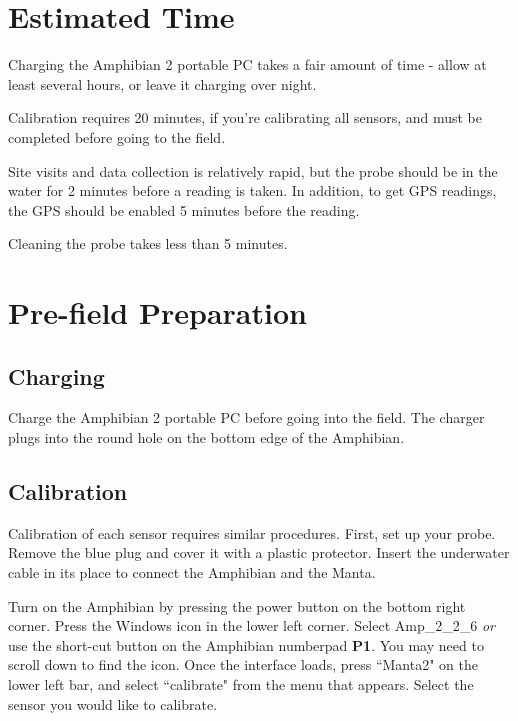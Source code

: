 \documentclass[12pt]{../SOP3}\usepackage[]{graphicx}\usepackage[]{color}
\begin{document}

\section{Estimated Time}

\NP Charging the Amphibian 2 portable PC takes a fair amount of time - allow at least several hours, or leave it charging over night. 

\NP Calibration requires 20 minutes, if you're calibrating all sensors, and must be completed before going to the field.

\NP Site visits and data collection is relatively rapid, but the probe should be in the water for 2 minutes before a reading is taken. In addition, to get GPS readings, the GPS should be enabled 5 minutes before the reading.

\NP Cleaning the probe takes less than 5 minutes.

\section{Pre-field Preparation}

\subsection{Charging}

\NP Charge the Amphibian 2 portable PC before going into the field. The charger plugs into the round hole on the bottom edge of the Amphibian. 

\subsection{Calibration}

\NP Calibration of each sensor requires similar procedures. First, set up your probe. Remove the blue plug and cover it with a plastic protector. Insert the underwater cable in its place to connect the Amphibian and the Manta. 

\NP Turn on the Amphibian by pressing the power button on the bottom right corner. Press the Windows icon in the lower left corner. Select Amp\_2\_2\_6 \emph{or} use the short-cut button on the Amphibian numberpad \textbf{P1}. You may need to scroll down to find the icon. Once the interface loads, press ``Manta2" on the lower left bar, and select ``calibrate" from the menu that appears. Select the sensor you would like to calibrate. 
\end{document}
